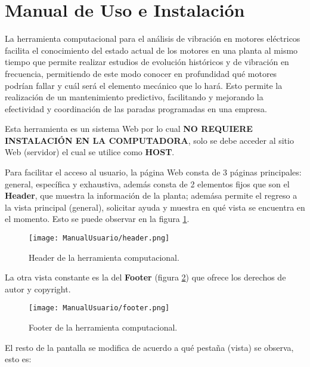 \thispagestyle{empty}
\section{Manual de Uso e Instalación}\label{anexoA}

La herramienta computacional para el análisis de vibración en motores eléctricos
facilita el conocimiento del estado actual de los motores en una planta al mismo
tiempo que permite realizar estudios de evolución históricos y de vibración en
frecuencia, permitiendo de este modo conocer en profundidad qué motores podrían
fallar y cuál será el elemento mecánico que lo hará. Esto permite la realización
de un mantenimiento predictivo, facilitando y mejorando la efectividad y
coordinación de las paradas programadas en una empresa.

Esta herramienta es un sistema Web por lo cual \textbf{NO REQUIERE INSTALACIÓN
EN LA COMPUTADORA}, solo se debe acceder al sitio Web (servidor) el cual se
utilice como \textbf{HOST}.

Para facilitar el acceso al usuario, la página Web consta de 3 páginas principales:
general, específica y exhaustiva, además consta de 2 elementos fijos que son el
\textbf{Header}, que muestra la información de la planta;  ademása permite
el regreso a la vista principal (general),  solicitar ayuda y muestra en qué
vista se encuentra en el momento. Esto se puede observar en la figura
\ref{img:HeaderHerramienta}.

    \begin{figure}[H]
		\centering
        \caption{Header de la herramienta computacional. }
        \texttt{[image: ManualUsuario/header.png]}
        \label{img:HeaderHerramienta}
	\end{figure}

La otra vista constante es la del \textbf{Footer} (figura
\ref{img:FooterHerramienta}) que ofrece los derechos de autor
y copyright.

    \begin{figure}[H]
		\centering
        \caption{Footer de la herramienta computacional. }
        \texttt{[image: ManualUsuario/footer.png]}
        \label{img:FooterHerramienta}
	\end{figure}

El resto de la pantalla se modifica de acuerdo a qué pestaña (vista) se observa,
esto es:

